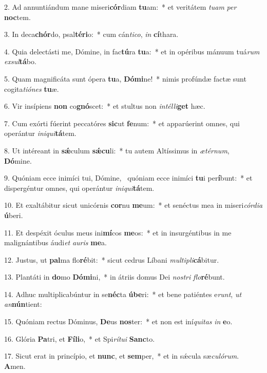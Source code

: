 2. Ad annuntiándum mane miseri\textbf{cór}diam \textbf{tu}am:~*  et veritátem \textit{tu}\textit{am} \textit{per} \textbf{noc}tem.\

3. In deca\textbf{chór}do, psal\textbf{té}\textbf{ri}o:~*  cum cán\textit{ti}\textit{co}, \textit{in} \textbf{cí}thara.\

4. Quia delectásti me, Dómine, in fac\textbf{tú}ra \textbf{tu}a:~*  et in opéribus mánuum tuá\textit{rum} \textit{ex}\textit{sul}\textbf{tá}bo.\

5. Quam magnificáta sunt ópera \textbf{tu}a, \textbf{Dó}\textbf{mi}ne!~*  nimis profúndæ factæ sunt cogita\textit{ti}\textit{ó}\textit{nes} \textbf{tu}æ.\

6. Vir insípiens \textbf{non} co\textbf{gnó}scet:~*  et stultus non \textit{in}\textit{tél}\textit{li}\textbf{get} hæc.\

7. Cum exórti fúerint peccatóres \textbf{sic}ut \textbf{fe}num:~*  et apparúerint omnes, qui operántur \textit{in}\textit{i}\textit{qui}\textbf{tá}tem.\

8. Ut intéreant in \textbf{sǽ}culum \textbf{sǽ}\textbf{cu}li:~*  tu autem Altíssimus in \textit{æ}\textit{tér}\textit{num}, \textbf{Dó}mine.\

9. Quóniam ecce inimíci tui, Dómine, \dag\  quóniam ecce inimíci \textbf{tu}i per\textbf{í}bunt:~*  et dispergéntur omnes, qui operántur \textit{in}\textit{i}\textit{qui}\textbf{tá}tem.\

10. Et exaltábitur sicut unicórnis \textbf{cor}nu \textbf{me}um:~*  et senéctus mea in miseri\textit{cór}\textit{di}\textit{a} \textbf{ú}beri.\

11. Et despéxit óculus meus ini\textbf{mí}cos \textbf{me}os:~*  et in insurgéntibus in me malignántibus áudi\textit{et} \textit{au}\textit{ris} \textbf{me}a.\

12. Justus, ut \textbf{pal}ma flo\textbf{ré}bit:~*  sicut cedrus Líbani \textit{mul}\textit{ti}\textit{pli}\textbf{cá}bitur.\

13. Plantáti in \textbf{do}mo \textbf{Dó}\textbf{mi}ni,~*  in átriis domus Dei \textit{nos}\textit{tri} \textit{flo}\textbf{ré}bunt.\

14. Adhuc multiplicabúntur in se\textbf{néc}ta \textbf{ú}\textbf{be}ri:~*  et bene patiéntes e\textit{runt}, \textit{ut} \textit{an}\textbf{nún}tient:\

15. Quóniam rectus Dóminus, \textbf{De}us \textbf{nos}ter:~*  et non est iní\textit{qui}\textit{tas} \textit{in} \textbf{e}o.\

16. Glória \textbf{Pa}tri, et \textbf{Fí}\textbf{li}o,~*  et Spi\textit{rí}\textit{tu}\textit{i} \textbf{Sanc}to.\

17. Sicut erat in princípio, et \textbf{nunc}, et \textbf{sem}per,~*  et in sǽcula sæ\textit{cu}\textit{ló}\textit{rum}. \textbf{A}men.\


